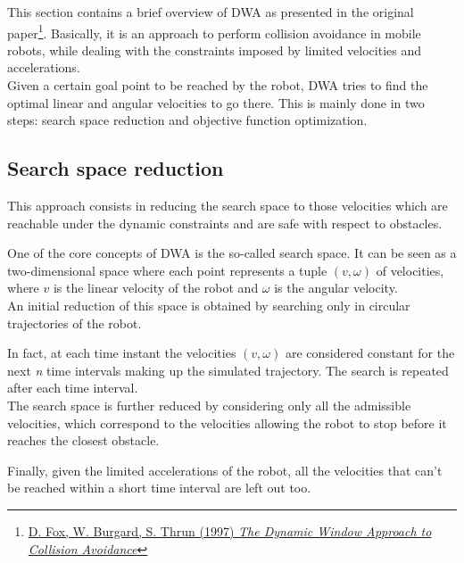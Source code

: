 \documentclass[11pt,a4paper]{article}
\begin{document}
This section contains a brief overview of DWA as presented in the original
paper\footnote{\href{https://www.ri.cmu.edu/pub_files/pub1/fox_dieter_1997_1/fox_dieter_1997_1.pdf}
{D. Fox, W. Burgard, S. Thrun (1997) \textit{The Dynamic Window Approach to Collision Avoidance}}}.
Basically, it is an approach to perform collision avoidance in mobile robots, while dealing with the constraints
imposed by limited velocities and accelerations.\\

Given a certain goal point to be reached by the robot, DWA tries to find the optimal linear and angular velocities
to go there. This is mainly done in two steps: search space reduction and objective function optimization.



\subsection{Search space reduction}

This approach consists in reducing the search space to those velocities which are reachable under the dynamic
constraints and are safe with respect to obstacles.

One of the core concepts of DWA is the so-called search space. It can be seen as a two-dimensional space where
each point represents a tuple $(v, \omega)$ of velocities, where $v$ is the linear velocity of the robot and
$\omega$ is the angular velocity.\\

An initial reduction of this space is obtained by searching only in circular trajectories of the robot.

In fact, at each time instant the velocities $(v, \omega)$ are considered constant for the next \textit{n}
time intervals making up the simulated trajectory. The search is repeated after each time interval.\\

The search space is further reduced by considering only all the admissible velocities, which correspond to
the velocities allowing the robot to stop before it reaches the closest obstacle.

Finally, given the limited accelerations of the robot, all the velocities that can't be reached within a short
time interval are left out too.\\
\end{document}
